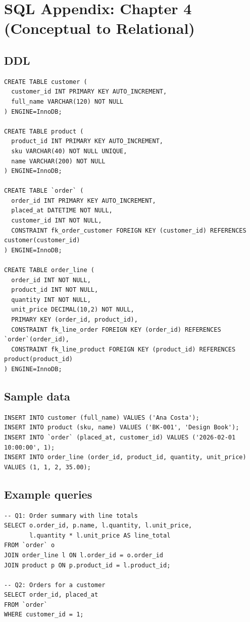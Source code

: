 \chapter{SQL Appendix: Chapter 4 (Conceptual to Relational)}

\section{DDL}
\begin{verbatim}
CREATE TABLE customer (
  customer_id INT PRIMARY KEY AUTO_INCREMENT,
  full_name VARCHAR(120) NOT NULL
) ENGINE=InnoDB;

CREATE TABLE product (
  product_id INT PRIMARY KEY AUTO_INCREMENT,
  sku VARCHAR(40) NOT NULL UNIQUE,
  name VARCHAR(200) NOT NULL
) ENGINE=InnoDB;

CREATE TABLE `order` (
  order_id INT PRIMARY KEY AUTO_INCREMENT,
  placed_at DATETIME NOT NULL,
  customer_id INT NOT NULL,
  CONSTRAINT fk_order_customer FOREIGN KEY (customer_id) REFERENCES customer(customer_id)
) ENGINE=InnoDB;

CREATE TABLE order_line (
  order_id INT NOT NULL,
  product_id INT NOT NULL,
  quantity INT NOT NULL,
  unit_price DECIMAL(10,2) NOT NULL,
  PRIMARY KEY (order_id, product_id),
  CONSTRAINT fk_line_order FOREIGN KEY (order_id) REFERENCES `order`(order_id),
  CONSTRAINT fk_line_product FOREIGN KEY (product_id) REFERENCES product(product_id)
) ENGINE=InnoDB;
\end{verbatim}

\section{Sample data}
\begin{verbatim}
INSERT INTO customer (full_name) VALUES ('Ana Costa');
INSERT INTO product (sku, name) VALUES ('BK-001', 'Design Book');
INSERT INTO `order` (placed_at, customer_id) VALUES ('2026-02-01 10:00:00', 1);
INSERT INTO order_line (order_id, product_id, quantity, unit_price)
VALUES (1, 1, 2, 35.00);
\end{verbatim}

\section{Example queries}
\begin{verbatim}
-- Q1: Order summary with line totals
SELECT o.order_id, p.name, l.quantity, l.unit_price,
       l.quantity * l.unit_price AS line_total
FROM `order` o
JOIN order_line l ON l.order_id = o.order_id
JOIN product p ON p.product_id = l.product_id;

-- Q2: Orders for a customer
SELECT order_id, placed_at
FROM `order`
WHERE customer_id = 1;
\end{verbatim}

